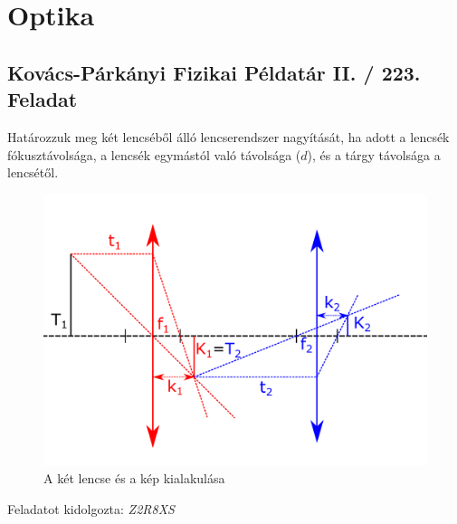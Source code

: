 \documentclass[11pt,a4paper,openany,leqno]{article}
\begin{document}
\section{Optika}
\subsection{Kovács-Párkányi Fizikai Példatár II. / 223. Feladat}
\indent
Határozzuk meg két lencséből álló lencserendszer nagyítását, ha adott a lencsék fókusztávolsága, a lencsék egymástól való távolsága ($d$), és a tárgy távolsága a lencsétől.
\begin{figure}[h!]
\centering
  \includegraphics[width=120mm,scale=0.5]{kep11.pdf}
  \caption{A két lencse és a kép kialakulása}
  \label{}
\end{figure} 
 \indent



\begin{flushright} {Feladatot kidolgozta: {\it Z2R8XS}} \end{flushright}

\vspace{0.5cm}
\end{document}
